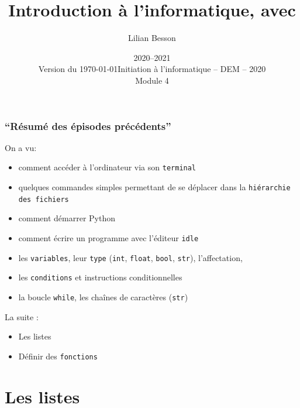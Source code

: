 \documentclass{beamer}
\title{Introduction à l'informatique, avec \pyth{}}
\author{Lilian Besson}
\date{2020--2021\\Version du \today}
\institute%
{
  ENS Rennes
  }
\date%
[Info -- DEM -- 2020]{Initiation à l'informatique -- DEM -- 2020\\Module 4}
\newcommand{\pyth}{{\sc Python}}
\newcommand{\prog}[1]{\alert{\texttt{#1}}}
\begin{document}
\frame{\titlepage}

\section[Outline]{}
\frame{\tableofcontents}
\frame
{
\frametitle{``Résumé des épisodes précédents''}
{
On a vu:
  \begin{itemize}
  \item comment accéder à l'ordinateur via son \prog{terminal}
  \item quelques commandes simples permettant de se déplacer dans la \prog{hiérarchie des fichiers}
  \item comment démarrer \pyth{}
  \item comment écrire un programme avec l'éditeur \prog{idle}
  \item les \prog{variables}, leur \prog{type} (\prog{int}, \prog{float}, \prog{bool}, \prog{str}), l'affectation,
  \item les \prog{conditions} et instructions conditionnelles
  \item la boucle \prog{while}, les chaînes de caractères (\prog{str})
  \end{itemize}
  La suite :
  \begin{itemize}
    \item Les listes
    \item Définir des \prog{fonctions}
  \end{itemize}
}
}
\section{Les listes}
\end{document}
